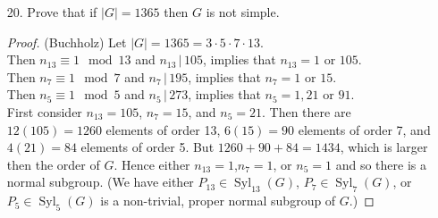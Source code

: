 \documentclass[10pt]{article}
\newcommand{\divides}{\, \Big | \,}
\begin{document}
\begin{itemize}
\begin{proof}(Baggett) \ We have that $|G| = 3\cdot5\cdot7$. From Sylow's Theorem, we
have that $n_5 \equiv 1 (mod \ 5)$ and $n_5 \divides 21$. Thus, $n_5 = 1$ or 21. Similarly,
we have that $n_7 \equiv 1 (mod \ 7)$ and $n_7 \divides 15$. Thus, $n_7 = 1$ or 15. We will
show that $n_5 = 1$ or $n_7 = 1$. Suppose to the contrary that $n_5 = 21$ and $n_7 = 15$.
Then there are $21(4) = 84$ elements of order 5 in $G$ and $15(6) = 90$ elements of order
7 in $G$. This is a contradiction since $84 + 90 > 105$. Thus, either $n_5 = 1$ or $n_7 = 1$. \\
\ \ Suppose that $n_5 = 1$. Then there is a unique Sylow 5-subgroup $P \triangleleft G$. Let 
$Q \in Syl_7(G)$. Then $Q \leq N_G(P) = G$, so $PQ \leq G$. Furthermore, 
$|PQ| = \frac{|P||Q|}{|P \cap Q|} = 35$ and $[G:PQ] = 3$, the smallest prime dividing $|G|$.
Thus, $PQ \triangleleft G$. Moreover, $Q \leq PQ$, $n_7(PQ) \equiv 1 (mod 7)$, and 
$n_7(PQ) \divides 5$. Thus, $n_7(PQ) = 1$ and $Q$ is the unique Sylow 7-subgroup of $PQ$. 
Therefore, $Q$ is characteristic in $PQ$. Since $Q$ char $PQ$ and $PQ \triangleleft G$,
it follows that $Q \triangleleft G$. Thus, there is a normal Sylow 5-subgroup $P$ in $G$ and
a normal Sylow 7-subgroup $Q$ in $G$. The proof for the case when $n_7 = 1$ is similar.
\end{proof}



\item[20.]    Prove that if $|G|=1365$ then $G$ is not simple.
 
\begin{proof}(Buchholz)
Let $|G|=1365=3\cdot 5\cdot 7\cdot 13$.\\
Then $n_{13}\equiv 1 \mod 13$ and $n_{13} \divides 105$, implies that $n_{13}=1\text{ or }105.$\\ 
Then $n_{7}\equiv 1 \mod 7$ and $n_{7} \divides 195$, implies that $n_{7}=1\text{ or }15.$\\
Then $n_{5}\equiv 1 \mod 5$ and $n_{5} \divides 273$, implies that $n_{5}=1,21\text{ or }91.$\\
First consider $n_{13}=105$, $n_7=15$, and $n_5=21$.  Then there are $12(105)=1260$ elements of order 13, $6(15)=90$ elements of order 7, and $4(21)=84$ elements of order 5.  But $1260+90+84=1434$, which is larger then the order of $G$.  Hence either $n_{13}=1$,$n_7=1$, or $n_5=1$ and so there is a normal subgroup.  (We have either $P_{13}\in \operatorname{Syl}_{13}(G)$, $P_{7}\in \operatorname{Syl}_{7}(G)$, or $P_{5}\in \operatorname{Syl}_{5}(G)$ is a non-trivial, proper normal subgroup of $G$.)


\end{proof}
\end{itemize}
\end{document}
